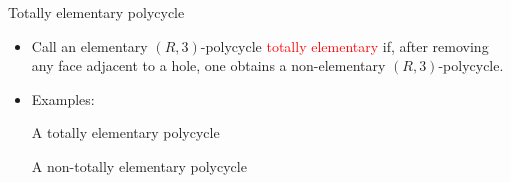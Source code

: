 \documentclass[%
pdf,
colorBG,
slideColor,
]{prosper}
\begin{document}
\begin{slide}{Totally elementary polycycle}
\vspace{-3mm}
\begin{itemize}
\item Call an elementary $(R,3)$-polycycle \textcolor{red}{totally elementary} if, after removing any face adjacent to a hole, one obtains a non-elementary $(R,3)$-polycycle.
\item Examples:
\begin{center}
\begin{minipage}[b]{5.0cm}
\centering
{}\par
A totally elementary polycycle
\end{minipage}
\begin{minipage}[b]{5.0cm}
\centering
{}\par
A non-totally elementary polycycle
\end{minipage}
\end{center}
\end{itemize}
\end{slide}
\end{document}
